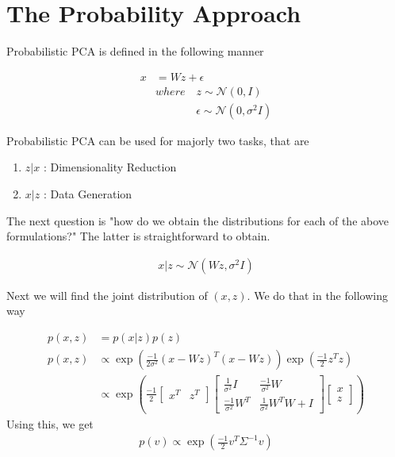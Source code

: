 \documentclass[10pt,onecolumn,letterpaper]{article}
\begin{document}
\section{The Probability Approach}
Probabilistic PCA is defined in the following manner

\begin{align}
x &= Wz + \epsilon \\
& where \quad z \sim \mathcal{N}(0, I)\\
&\quad\quad\quad\ \ \ \epsilon \sim \mathcal{N}(0, \sigma^2 I)
\end{align}


Probabilistic PCA can be used for majorly two tasks, that are
\begin{enumerate}
    \item $z|x$ : Dimensionality Reduction
    \item $x|z$ : Data Generation
\end{enumerate}

The next question is "how do we obtain the distributions for each of the above formulations?" The latter is straightforward to obtain.

\begin{align}
x|z \sim \mathcal{N}\left(Wz, \sigma^2 I\right)
\end{align}

Next we will find the joint distribution of $(x, z)$. We do that in the following way

\begin{align}
    p(x,z) &= p(x|z)p(z)\\
    p(x,z) & \propto \exp\left(
      \frac{-1}{2\sigma^2} \left( x-Wz\right)^T\left( x-Wz\right)
      \right) 
      \exp\left(\frac{-1}{2}z^Tz\right) \\
      & \propto \exp\left(
        \frac{-1}{2}
        \begin{bmatrix}x^T & z^T\end{bmatrix}
        \begin{bmatrix} \frac{1}{\sigma^2}I& \frac{-1}{\sigma^2}W \\
        \frac{-1}{\sigma^2}W^T & \frac{1}{\sigma^2}W^T W + I \end{bmatrix}
        \begin{bmatrix}x \\ z\end{bmatrix}
      \right)
\end{align}
Using this, we get
\begin{align}
    p(v) \propto \exp\left(\frac{-1}{2}v^T\Sigma^{-1}v\right)
\end{align}
\end{document}
